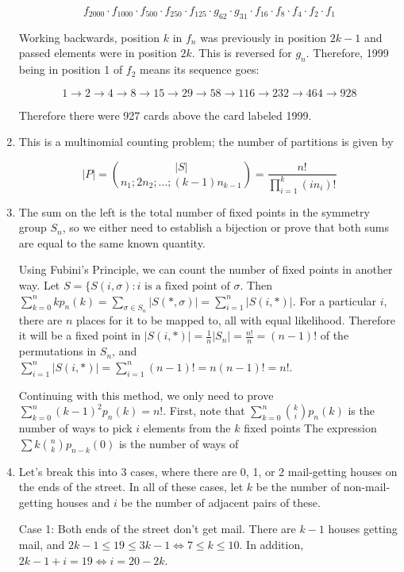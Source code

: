 \documentclass{book}
\numberwithin{equation}{section}
\begin{document}
\begin{enumerate}[label={9.\arabic*}]
$$f_{2000}\cdot f_{1000}\cdot f_{500}\cdot f_{250}\cdot f_{125}\cdot g_{62}\cdot g_{31}\cdot f_{16}\cdot f_{8}\cdot f_{4}\cdot f_{2}\cdot f_{1}$$

Working backwards, position $k$ in $f_n$ was previously in position $2k - 1$ and passed elements were in position $2k$.
This is reversed for $g_n$.
Therefore, 1999 being in position 1 of $f_2$ means its sequence goes:

$$1 \to 2 \to 4 \to 8 \to 15 \to 29 \to 58 \to 116 \to 232 \to 464 \to 928$$

Therefore there were 927 cards above the card labeled 1999.

\item
This is a multinomial counting problem; the number of partitions is given by

$$|P| = {|S| \choose n_1; 2n_2; \ldots; (k-1)n_{k-1}} = \frac{n!}{\prod_{i=1}^k (in_{i})!}$$

\item
The sum on the left is the total number of fixed points in the symmetry group $S_n$, so we either need to establish
a bijection or prove that both sums are equal to the same known quantity.

Using Fubini's Principle, we can count the number of fixed points in another way. Let 
$S = \{S(i, \sigma) : i \text{ is a fixed point of } \sigma$. Then $\sum_{k=0}^n kp_n(k) = \sum_{\sigma \in S_n} |S(*, \sigma)|
= \sum_{i =1}^n |S(i, *)|$.
For a particular $i$, there are $n$ places for it to be mapped to, all with equal likelihood. Therefore it will be a
fixed point in $|S(i, *)| = \frac{1}{n}|S_n| = \frac{n!}{n} = (n-1)!$ of the permutations in $S_n$, and
$\sum_{i =1}^n |S(i, *)| = \sum_{i=1}^n (n-1)! = n(n-1)! = n!$.

Continuing with this method, we only need to prove $\sum_{k=0}^n (k-1)^2 p_n (k) = n!$. First, note that
$\sum_{k=0}^n {k \choose i} p_n (k)$ is the number of ways to pick $i$ elements from the $k$ fixed points
The expression
$\sum k {n \choose k} p_{n-k} (0)$ is the number of ways of  

\item
Let's break this into 3 cases, where there are 0, 1, or 2 mail-getting houses on the ends of the street. In all of these
cases, let $k$ be the number of non-mail-getting houses and $i$ be the number of adjacent pairs of these.

Case 1: Both ends of the street don't get mail. There
are $k-1$ houses getting mail, and $2k-1 \leq 19 \leq 3k-1 \iff 7 \leq k \leq 10$. In addition, $2k - 1 + i = 19 \iff
i = 20 - 2k$.


\end{enumerate}
\end{document}
